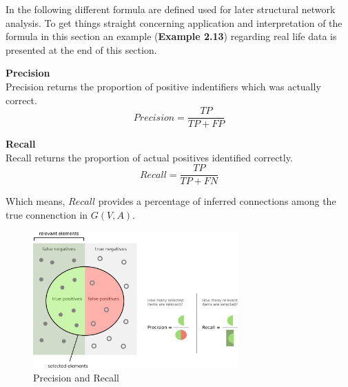 
In the following different formula are defined used for later structural network analysis. To get things straight concerning application and interpretation of the formula in this section an example (\textbf{Example 2.13}) regarding real life data is presented at the end of this section.


\begin{defn}\textbf{Precision}\\ 
Precision returns the proportion of positive indentifiers which was actually correct.\\
\begin{equation}
Precision=\frac{TP}{TP+FP}
\end{equation}
\end{defn}

\begin{defn}\textbf{Recall}\\
Recall returns the proportion of actual positives identified correctly.\\
\begin{equation}
Recall=\frac{TP}{TP+FN}
\end{equation}
\end{defn}

Which means, $Recall$ provides a percentage of inferred connections among the true connenction in $G(V,A)$.

\begin{figure}[H]
\centering
\includegraphics[width=0.7\textwidth]{./Bilder/Precisionrecall.pdf}
\caption[Precision and Recall]{Precision and Recall}
\label{fig:Pipeline}
\end{figure} 



